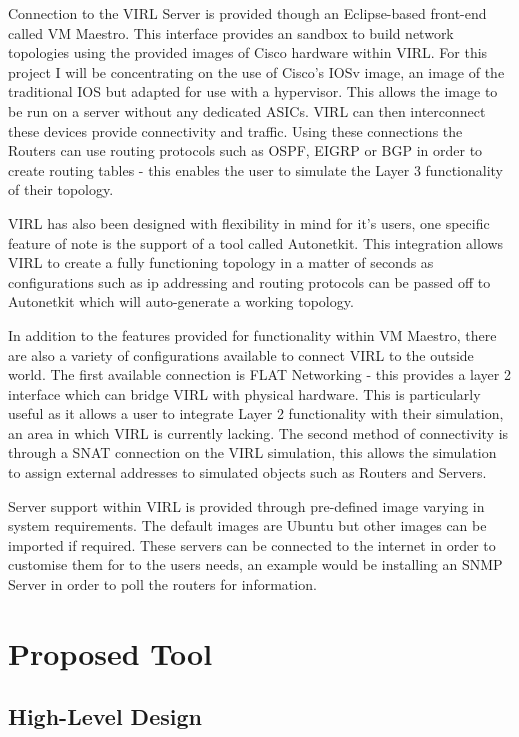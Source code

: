 \documentclass[11pt]{report}
\begin{document}
Connection to the VIRL Server is provided though an Eclipse-based front-end called VM Maestro. This interface provides an sandbox to build network topologies using the provided images of Cisco hardware within VIRL. For this project I will be concentrating on the use of Cisco's IOSv image, an image of the traditional IOS but adapted for use with a hypervisor. This allows the image to be run on a server without any dedicated ASICs. VIRL can then interconnect these devices provide connectivity and traffic. Using these connections the Routers can use routing protocols such as OSPF, EIGRP or BGP in order to create routing tables - this enables the user to simulate the Layer 3 functionality of their topology.

VIRL has also been designed with flexibility in mind for it's users, one specific feature of note is the support of a tool called Autonetkit. This integration allows VIRL to create a fully functioning topology in a matter of seconds as configurations such as ip addressing and routing protocols can be passed off to Autonetkit which will auto-generate a working topology.

In addition to the features provided for functionality within VM Maestro, there are also a variety of configurations available to connect VIRL to the outside world. The first available connection is FLAT Networking - this provides a layer 2 interface which can bridge VIRL with physical hardware. This is particularly useful as it allows a user to integrate Layer 2 functionality with their simulation, an area in which VIRL is currently lacking. The second method of connectivity is through a SNAT connection on the VIRL simulation, this allows the simulation to assign external addresses to simulated objects such as Routers and Servers.

Server support within VIRL is provided through pre-defined image varying in system requirements. The default images are Ubuntu but other images can be imported if required. These servers can be connected to the internet in order to customise them for to the users needs, an example would be installing an SNMP Server in order to poll the routers for information.

\chapter{Proposed Tool}

\section{High-Level Design}
\end{document}
